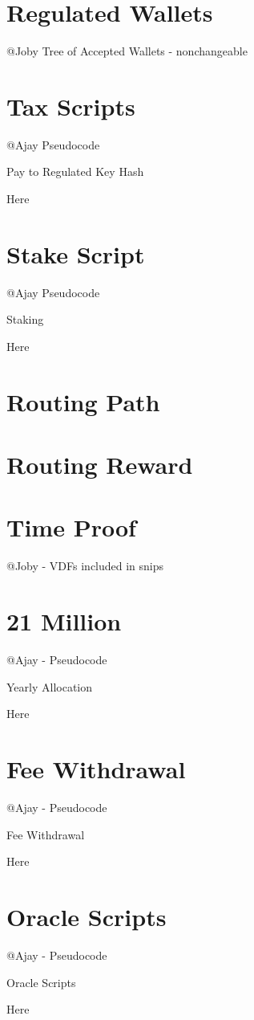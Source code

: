 \documentclass[a4paper,10pt]{article}
\begin{document}
\section{Regulated Wallets}
@Joby Tree of Accepted Wallets - nonchangeable
\section{Tax Scripts}
@Ajay Pseudocode
\begin{algorithm}
\caption{Pay to Regulated Key Hash}
Here
\end{algorithm}
\section{Stake Script}
@Ajay Pseudocode
\begin{algorithm}
\caption{Staking}
Here
\end{algorithm}
\section{Routing Path}
\section{Routing Reward}
\section{Time Proof}
@Joby - VDFs included in snips
\section{21 Million}
@Ajay - Pseudocode
\begin{algorithm}
\caption{Yearly Allocation}
Here
\end{algorithm}
\section{Fee Withdrawal}
@Ajay - Pseudocode
\begin{algorithm}
\caption{Fee Withdrawal}
Here
\end{algorithm}
\section{Oracle Scripts}
@Ajay - Pseudocode
\begin{algorithm}
\caption{Oracle Scripts}
Here
\end{algorithm}
\end{document}
